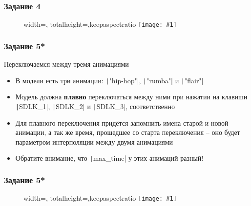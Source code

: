 \documentclass{beamer}
\newcommand{\slideimage}[1]{
  \begin{figure}
    \begin{adjustbox}{width=\textwidth, totalheight=\textheight-2\baselineskip-2\baselineskip,keepaspectratio}
      \texttt{[image: \#1]}
    \end{adjustbox}
  \end{figure}
}
\begin{document}
\begin{frame}[fragile]
\frametitle{Задание 4}
\slideimage{4.png}
\end{frame}

\begin{frame}[fragile]
\frametitle{Задание 5*}
\begin{footnotesize}
Переключаемся между тремя анимациями
\begin{itemize}
\item В модели есть три анимации: \texttt|"hip-hop"|, \texttt|"rumba"| и \texttt|"flair"|
\item Модель должна \textbf{плавно} переключаться между ними при нажатии на клавиши \texttt|SDLK_1|, \texttt|SDLK_2| и \texttt|SDLK_3|, соответственно
\item Для плавного переключения придётся запомнить имена старой и новой анимации, а так же время, прошедшее со старта переключения -- оно будет параметром интерполяции между двумя анимациями
\begin{itemize}
\end{itemize}
\item Обратите внимание, что \texttt|max_time| у этих анимаций разный!
\end{itemize}
\end{footnotesize}
\end{frame}

\begin{frame}[fragile]
\frametitle{Задание 5*}
\slideimage{5.png}
\end{frame}
\end{document}
